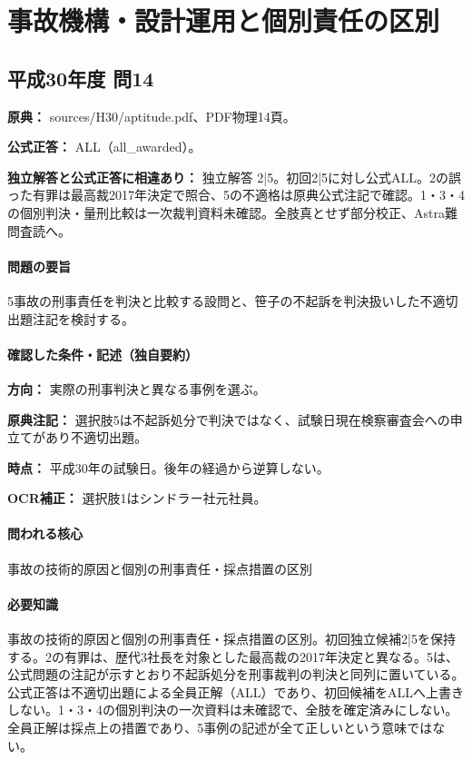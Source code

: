\section{事故機構・設計運用と個別責任の区別}

\subsection{平成30年度 問14}
\label{q:h30-reg-apt-14}

\noindent\textbf{原典：} sources/H30/aptitude.pdf、PDF物理14頁。

\textbf{公式正答：} ALL（all\_awarded）。

\par\textbf{独立解答と公式正答に相違あり：} 独立解答 2|5。初回2|5に対し公式ALL。2の誤った有罪は最高裁2017年決定で照合、5の不適格は原典公式注記で確認。1・3・4の個別判決・量刑比較は一次裁判資料未確認。全肢真とせず部分校正、Astra難問査読へ。

\paragraph{問題の要旨} 5事故の刑事責任を判決と比較する設問と、笹子の不起訴を判決扱いした不適切出題注記を検討する。

\paragraph{確認した条件・記述（独自要約）}\mbox{}\par

\noindent\textbf{方向：} 実際の刑事判決と異なる事例を選ぶ。\par

\noindent\textbf{原典注記：} 選択肢5は不起訴処分で判決ではなく、試験日現在検察審査会への申立てがあり不適切出題。\par

\noindent\textbf{時点：} 平成30年の試験日。後年の経過から逆算しない。\par

\noindent\textbf{OCR補正：} 選択肢1はシンドラー社元社員。\par

\paragraph{問われる核心} 事故の技術的原因と個別の刑事責任・採点措置の区別

\paragraph{必要知識} 事故の技術的原因と個別の刑事責任・採点措置の区別。初回独立候補2|5を保持する。2の有罪は、歴代3社長を対象とした最高裁の2017年決定と異なる。5は、公式問題の注記が示すとおり不起訴処分を刑事裁判の判決と同列に置いている。公式正答は不適切出題による全員正解（ALL）であり、初回候補をALLへ上書きしない。1・3・4の個別判決の一次資料は未確認で、全肢を確定済みにしない。全員正解は採点上の措置であり、5事例の記述が全て正しいという意味ではない。

